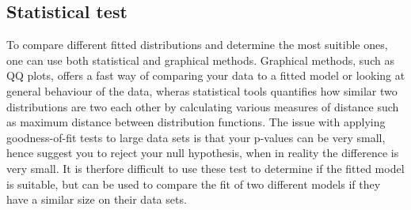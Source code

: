 \documentclass{article}
\begin{document}
	\subsection{Statistical test}
	To compare different fitted distributions and determine the most suitible ones, one can use both statistical and graphical methods. Graphical methods, such as QQ plots, offers a fast way of comparing your data to a fitted model or looking at general behaviour of the data, wheras statistical tools quantifies how similar two distributions are two each other by calculating various measures of distance such as maximum distance between distribution functions. The issue with applying goodness-of-fit tests to large data sets is that your p-values can be very small, hence suggest you to reject your null hypothesis, when in reality the difference is very small. It is therfore difficult to use these test to determine if the fitted model is suitable, but can be used to compare the fit of two different models if they have a similar size on their data sets.
	
\end{document}
